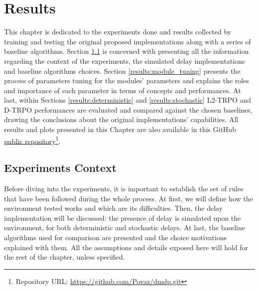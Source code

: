 \chapter{Results}
\label{chp:results}
    This chapter is dedicated to the experiments done and results collected by training and testing the original proposed implementations along with a series of baseline algorithms. Section \ref{results:context} is concerned with presenting all the information regarding the context of the experiments, the simulated delay implementations and baseline algorithms choices. Section \ref{results:module_tuning} presents the process of parameters tuning for the modules' parameters and explains the roles and importance of each parameter in terms of concepts and performances. At last, within Sections \ref{results:deterministic} and \ref{results:stochastic} L2-TRPO and D-TRPO performances are evaluated and compared against the chosen baselines, drawing the conclusions about the original implementations' capabilities. All results and plots presented in this Chapter are also available in this GitHub \href{https://github.com/Povaz/dmdp.git}{public repository}\footnote{Repository URL: \url{https://github.com/Povaz/dmdp.git}}.
    
    \section{Experiments Context}
    \label{results:context}
        Before diving into the experiments, it is important to establish the set of rules that have been followed during the whole process. At first, we will define how the environment tested works and which are its difficulties. Then, the delay implementation will be discussed: the presence of delay is simulated upon the environment, for both deterministic and stochastic delays. At last, the baseline algorithms used for comparison are presented and the choice motivations explained with them. All the assumptions and details exposed here will hold for the rest of the chapter, unless specified.
        
